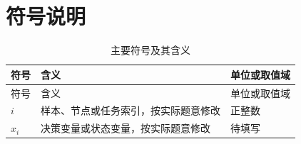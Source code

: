 \section{符号说明}

\begin{longtable}{p{}p{}p{}}
\caption{主要符号及其含义}\label{tab:symbols}\\
\toprule
符号 & 含义 & 单位或取值域 \\
\midrule
\endfirsthead
\toprule
符号 & 含义 & 单位或取值域 \\
\midrule
\endhead
\bottomrule
\endfoot
$i$ & 样本、节点或任务索引，按实际题意修改 & 正整数 \\
$x_i$ & 决策变量或状态变量，按实际题意修改 & 待填写 \\
\end{longtable}
